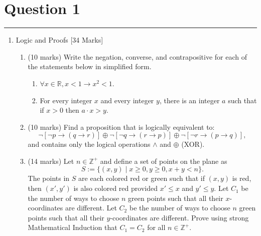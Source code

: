 \documentclass{article}
\begin{document}
\newcommand{\documentcourse}{COMP2121}
\newcommand{\documentnumber}{4}





\section*{Question 1}
\hrule
\vspace{0.5cm}

\begin{enumerate}
    \item Logic and Proofs [34 Marks]
          \begin{enumerate}
              \item (10 marks) Write the negation, converse, and contrapositive for each of the statements below in simplified form.
                    \begin{enumerate}[label=\roman*.]
                        \item $\forall x \in \mathbb{R}, x < 1 \rightarrow x^2 < 1$.
                        \item For every integer $x$ and every integer $y$, there is an integer $a$ such that if $x > 0$ then $a \cdot x > y$.
                    \end{enumerate}
              \item (10 marks) Find a proposition that is logically equivalent to:
                    \[
                        \neg[\neg p \rightarrow (q \rightarrow r)] \oplus \neg[\neg q \rightarrow (r \rightarrow p)] \oplus \neg[\neg r \rightarrow (p \rightarrow q)],
                    \]
                    and contains only the logical operations $\land$ and $\oplus$ (XOR).
              \item (14 marks) Let $n \in \mathbb{Z}^+$ and define a set of points on the plane as
                    \[
                        S := \{(x, y) \mid x \ge 0, y \ge 0, x + y < n\}.
                    \]
                    The points in $S$ are each colored red or green such that if $(x, y)$ is red, then $(x', y')$ is also colored red provided $x' \le x$ and $y' \le y$.
                    Let $C_1$ be the number of ways to choose $n$ green points such that all their $x$-coordinates are different. Let $C_2$ be the number of ways to choose $n$ green points such that all their $y$-coordinates are different. Prove using strong Mathematical Induction that $C_1 = C_2$ for all $n \in \mathbb{Z}^+$.
          \end{enumerate}
\end{enumerate}
\end{document}
